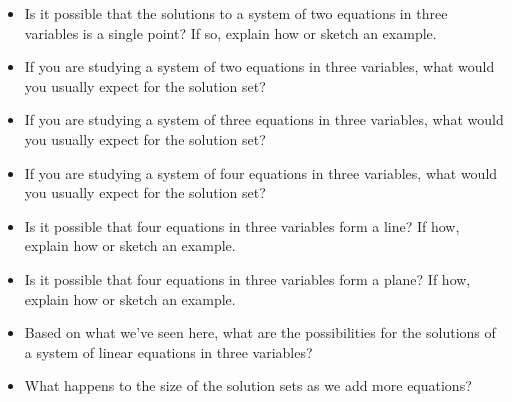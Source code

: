 \documentclass[12pt]{article}
\begin{document}
\begin{enumerate}
\begin{itemize}
        \vspace{1in}
      \item Is it possible that the solutions to a system of two
        equations in three variables is a single point?  If so,
        explain how or sketch an example.

        \vspace{1in}
      \item If you are studying a system of two equations in three
        variables, what would you usually expect for the solution set?

        \vspace{1in}
      \item If you are studying a system of three equations in three
        variables, what would you usually expect for the solution set?

        \vspace{1in}
      \item If you are studying a system of four equations in three
        variables, what would you usually expect for the solution
        set?

        \vspace{1in}
        \newpage
      \item Is it possible that four equations in three variables form
        a line?  If how, explain how or sketch an example.

        \vspace{1in}
      \item Is it possible that four equations in three variables form
        a plane?  If how, explain how or sketch an example.

      \vspace{1in}
      \item Based on what we've seen here, what are the possibilities for
      the solutions of a system of linear equations in three variables?
      
      \vspace{1in}
    \item What happens to the size of the solution sets as we add more
      equations? 
      
      \vspace{1in}
    \end{itemize}


\end{enumerate}
\end{document}
